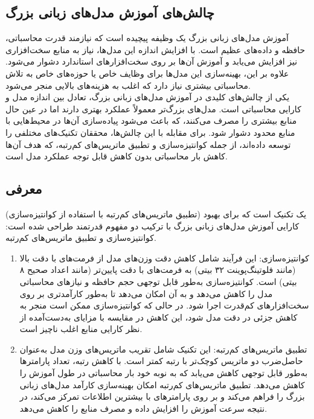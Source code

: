 \subsection{چالش‌های آموزش مدل‌های زبانی بزرگ}

آموزش مدل‌های زبانی بزرگ یک وظیفه پیچیده است که نیازمند قدرت محاسباتی، حافظه و داده‌های عظیم است. با افزایش اندازه این مدل‌ها، نیاز به منابع سخت‌افزاری نیز افزایش می‌یابد و آموزش آن‌ها بر روی سخت‌افزارهای استاندارد دشوار می‌شود. علاوه بر این، بهینه‌سازی این مدل‌ها برای وظایف خاص یا حوزه‌های خاص به تلاش محاسباتی بیشتری نیاز دارد که اغلب به هزینه‌های بالایی منجر می‌شود.
\\
یکی از چالش‌های کلیدی در آموزش مدل‌های زبانی بزرگ، تعادل بین اندازه مدل و کارایی محاسباتی است. مدل‌های بزرگ‌تر معمولاً عملکرد بهتری دارند اما در عین حال منابع بیشتری را مصرف می‌کنند، که باعث می‌شود پیاده‌سازی آن‌ها در محیط‌هایی با منابع محدود دشوار شود. برای مقابله با این چالش‌ها، محققان تکنیک‌های مختلفی را توسعه داده‌اند، از جمله کوانتیزه‌سازی و تطبیق ماتریس‌های کم‌رتبه، که هدف آن‌ها کاهش بار محاسباتی بدون کاهش قابل توجه عملکرد مدل است.

\subsection{معرفی }

 (تطبیق ماتریس‌های کم‌رتبه با استفاده از کوانتیزه‌سازی) یک تکنیک است که برای بهبود کارایی آموزش مدل‌های زبانی بزرگ با ترکیب دو مفهوم قدرتمند طراحی شده است: کوانتیزه‌سازی و تطبیق ماتریس‌های کم‌رتبه.
\begin{enumerate}
	\item
	      کوانتیزه‌سازی: این فرآیند شامل کاهش دقت وزن‌های مدل از فرمت‌های با دقت بالا (مانند فلوتینگ‌پوینت ۳۲ بیتی) به فرمت‌های با دقت پایین‌تر (مانند اعداد صحیح ۸ بیتی) است. کوانتیزه‌سازی به‌طور قابل توجهی حجم حافظه و نیازهای محاسباتی مدل را کاهش می‌دهد و به آن امکان می‌دهد تا به‌طور کارآمدتری بر روی سخت‌افزارهای کم‌قدرت اجرا شود. در حالی که کوانتیزه‌سازی ممکن است منجر به کاهش جزئی در دقت مدل شود، این کاهش در مقایسه با مزایای به‌دست‌آمده از نظر کارایی منابع اغلب ناچیز است.
	\item
	      تطبیق ماتریس‌های کم‌رتبه: این تکنیک شامل تقریب ماتریس‌های وزن مدل به‌عنوان حاصل‌ضرب دو ماتریس کوچک‌تر با رتبه کمتر است. با کاهش رتبه، تعداد پارامترها به‌طور قابل توجهی کاهش می‌یابد که به نوبه خود بار محاسباتی در طول آموزش را کاهش می‌دهد. تطبیق ماتریس‌های کم‌رتبه امکان بهینه‌سازی کارآمد مدل‌های زبانی بزرگ را فراهم می‌کند و بر روی پارامترهای با بیشترین اطلاعات تمرکز می‌کند، در نتیجه سرعت آموزش را افزایش داده و مصرف منابع را کاهش می‌دهد.
\end{enumerate}

